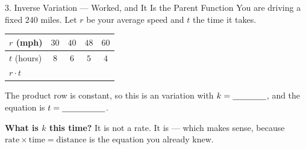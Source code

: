 \documentclass[10pt]{article}
\begin{document}
\begin{notesbox}{3. Inverse Variation --- Worked, and It Is the Parent Function}
You are driving a fixed $240$ miles. Let $r$ be your average speed and $t$ the time it takes.
\begin{center}
\renewcommand{\arraystretch}{1.35}
\begin{tabular}{|l|c|c|c|c|}
\hline
\rowcolor{forestbg}
$r$ (mph) & $30$ & $40$ & $48$ & $60$ \\ \hline
$t$ (hours) & $8$ & $6$ & $5$ & $4$ \\ \hline
$r\cdot t$ & & & & \\ \hline
\end{tabular}
\end{center}
\vspace{-2pt}
The product row is constant, so this is an \blank{2.4cm} variation with $k=\blank{1.4cm}$,
and the equation is $t=\blank{1.8cm}$.

\vspace{3pt}
\textbf{What is $k$ this time?} It is not a rate. It is \blank{5.8cm} --- which makes sense,
because $\text{rate}\times\text{time}=\text{distance}$ is the equation you already knew.


\end{notesbox}
\end{document}
